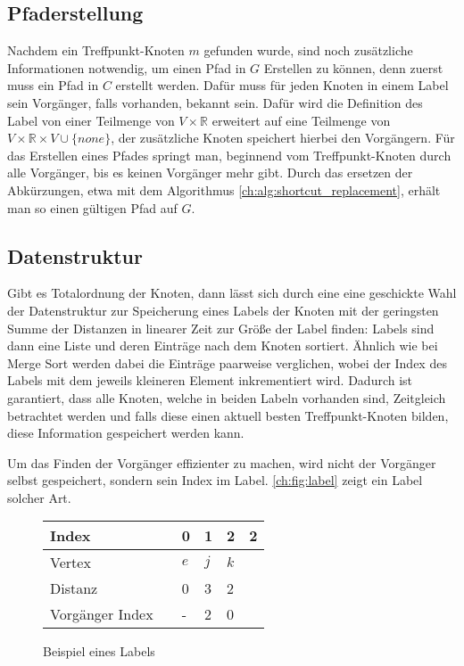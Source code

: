 \subsection{Pfaderstellung}

Nachdem ein Treffpunkt-Knoten $m$ gefunden wurde, sind noch zusätzliche Informationen notwendig, um einen Pfad in $G$ Erstellen zu können, denn zuerst muss ein Pfad in $C$ erstellt werden.
Dafür muss für jeden Knoten in einem Label sein Vorgänger, falls vorhanden, bekannt sein.
Dafür wird die Definition des Label von einer Teilmenge von $V \times \mathbb{R}$ erweitert auf eine Teilmenge von $V \times \mathbb{R} \times V \cup \{ none \} $, der zusätzliche Knoten speichert hierbei den Vorgängern.
Für das Erstellen eines Pfades springt man, beginnend vom Treffpunkt-Knoten durch alle Vorgänger, bis es keinen Vorgänger mehr gibt.
Durch das ersetzen der Abkürzungen, etwa mit dem Algorithmus \ref{ch:alg:shortcut_replacement}, erhält man so einen gültigen Pfad auf $G$.

\subsection{Datenstruktur}

Gibt es Totalordnung der Knoten, dann lässt sich durch eine eine geschickte Wahl der Datenstruktur zur Speicherung eines Labels der Knoten mit der geringsten Summe der Distanzen in linearer Zeit zur Größe der Label finden:
Labels sind dann eine Liste und deren Einträge nach dem Knoten sortiert.
Ähnlich wie bei Merge Sort werden dabei die Einträge paarweise verglichen, wobei der Index des Labels mit dem jeweils kleineren Element inkrementiert wird.
Dadurch ist garantiert, dass alle Knoten, welche in beiden Labeln vorhanden sind, Zeitgleich betrachtet werden und falls diese einen aktuell besten Treffpunkt-Knoten bilden, diese Information gespeichert werden kann.

Um das Finden der Vorgänger effizienter zu machen, wird nicht der Vorgänger selbst gespeichert, sondern sein Index im Label.
\autoref{ch:fig:label} zeigt ein Label solcher Art.

\begin{figure}[ht]
    \centering
    \begin{tabular}{@{}llllll@{}}
        \toprule
        Index           &  & 0   & 1   & 2   & 2 \\ \midrule
        Vertex          &  & $e$ & $j$ & $k$ &   \\
        Distanz         &  & 0   & 3   & 2   &   \\
        Vorgänger Index &  & -   & 2   & 0   &   \\ \bottomrule
    \end{tabular}
    \caption{Beispiel eines Labels}
    \label{ch:fig:label}
\end{figure}

